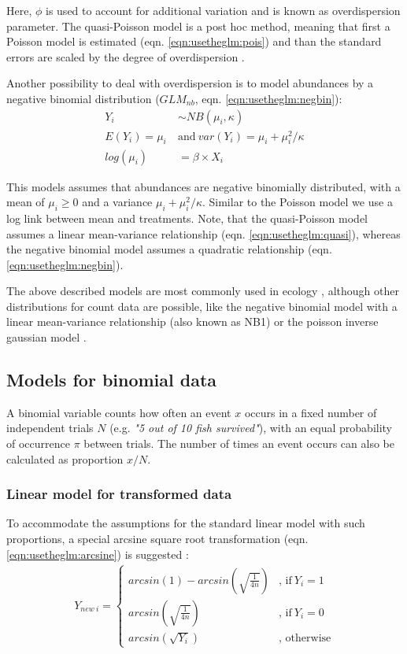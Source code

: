 Here, $\phi$ is used to account for additional variation and is known as overdispersion parameter.
The quasi-Poisson model is a post hoc method, meaning that first a Poisson model is estimated (eqn. \ref{eqn:usetheglm:pois}) and than the standard errors are scaled by the degree of overdispersion \citep{hilbe_modeling_2014}.

Another possibility to deal with overdispersion is to model abundances by a negative binomial distribution ($GLM_{nb}$, eqn. \ref{eqn:usetheglm:negbin}):
\begin{align}
  Y_i &\sim NB(\mu_i, \kappa) \nonumber  \\
  E(Y_i) = \mu_i ~&\text{and}~var(Y_i) = \mu_i + \mu_i^2 / \kappa \label{eqn:usetheglm:negbin} \\
  log(\mu_i) &= \beta \times X_i  \nonumber 
\end{align}

This models assumes that abundances are negative binomially distributed, with a mean of $\mu_i \ge 0$ and a variance $\mu_i + \mu_i^2 / \kappa$.
Similar to the Poisson model we use a log link between mean and treatments.
Note, that the quasi-Poisson model assumes a linear mean-variance relationship (eqn. \ref{eqn:usetheglm:quasi}), whereas the negative binomial model assumes a quadratic relationship (eqn. \ref{eqn:usetheglm:negbin}).

The above described models are most commonly used in ecology \citep{ver_hoef_quasi-poisson_2007}, although other distributions for count data are possible, like the negative binomial model with a linear mean-variance relationship (also known as NB1) or the poisson inverse gaussian model \citep{hilbe_modeling_2014}.


\subsection{Models for binomial data}
\label{ssec:usetheglm:bin}
A binomial variable counts how often an event $x$ occurs in a fixed number of independent trials $N$ (e.g. \emph{"5 out of 10 fish survived"}), with an equal probability of occurrence $\pi$ between trials.
The number of times an event occurs can also be calculated as proportion $x / N$.


\subsubsection{Linear model for transformed data}
To accommodate the assumptions for the standard linear model with such proportions, a special arcsine square root transformation (eqn. \ref{eqn:usetheglm:arcsine}) is suggested \citep{epa_methods_2002,newman_quantitative_2012}:
\begin{align}
  Y_{new~i} = 
  \begin{cases}  
    arcsin(1) - arcsin(\sqrt{\frac{1}{4n}}) & \text{, if}\ Y_i = 1 \\
    arcsin(\sqrt{\frac{1}{4n}}) & \text{, if}\ Y_i = 0  \\
    arcsin(\sqrt{Y_i}) & \text{, otherwise}
  \end{cases} \label{eqn:usetheglm:arcsine}
\end{align}

